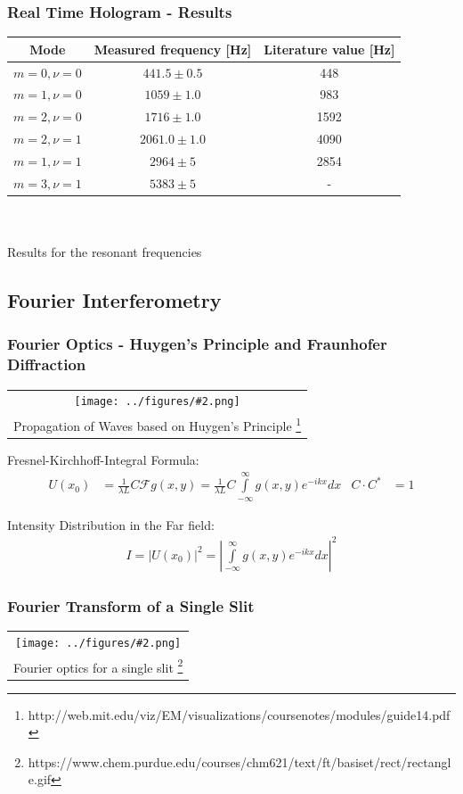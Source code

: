 \documentclass{beamer}
\newcommand{\gra}[3][]{
	\begin{table}
	\centering
	\begin{tabular}[width=\textwidth]{c}
		\texttt{[image: ../figures/\#2.png]}\\
		\small #3
	\end{tabular}
	\end{table}
}
\begin{document}
\begin{frame}
	\frametitle{Real Time Hologram - Results}
	\begin{table}
		\centering
		\begin{tabular}{c|c|c}
			Mode 		& Measured frequency [Hz] 	& Literature value [Hz]\\ \hline\hline
			$m=0,\nu=0$	& $441.5\pm0.5$					& 448	\\ \hline
			$m=1,\nu=0$	& $1059\pm1.0$				& 983	\\ \hline
			$m=2,\nu=0$	& $1716\pm1.0$				& 1592	\\ \hline
			$m=2,\nu=1$	& $2061.0\pm1.0$				& 4090	\\ \hline
			$m=1,\nu=1$	& $2964\pm5$				& 2854 \\ \hline
			$m=3,\nu=1$	& $5383\pm5$				&-
		\end{tabular}\\\scriptsize\ \\\small
		{Results for the resonant frequencies}
	\end{table}
\end{frame}

\subsection{Fourier Interferometry}
\frame{\tableofcontents[currentsubsection]}
\begin{frame}
	\frametitle{Fourier Optics - Huygen's Principle and Fraunhofer Diffraction}
	\gra[0.4]{Huygen}{Propagation of Waves based on Huygen's Principle \footnote{http://web.mit.edu/viz/EM/visualizations/coursenotes/modules/guide14.pdf}}
		Fresnel-Kirchhoff-Integral Formula:
		\begin{align}
		U(x_0) &= \frac{1}{\lambda L} C \mathscr{F}{g(x, y)}    = \frac{1}{\lambda L} C   \int\limits_{-\infty}^{\infty}  g(x,y)e^{-ikx}dx    &  C  \cdot C^* &= 1       
		\end{align}
		
		Intensity Distribution in the Far field:
		\begin{align}
		I=|U(x_0)|^2=\left| \int\limits_{-\infty}^{\infty} g(x,y)e^{-ikx}dx \right|^2
		\end{align}
\end{frame}

\begin{frame}
	\frametitle{Fourier Transform of a Single Slit}
\gra[0.8]{Einzelspalt}{Fourier optics for a single slit \footnote{https://www.chem.purdue.edu/courses/chm621/text/ft/basiset/rect/rectangle.gif}}
\end{frame}
\end{document}

